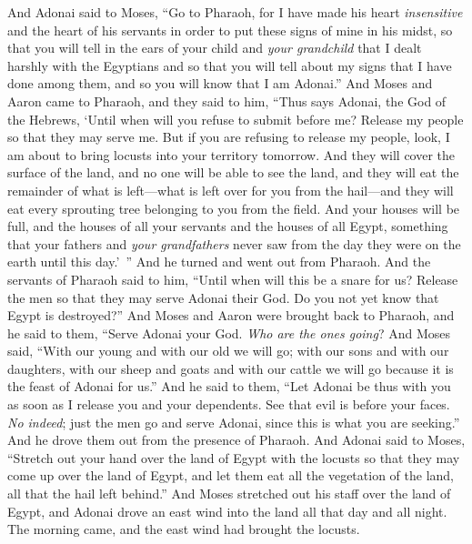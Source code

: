 \begin{biblechapter} %
 And Adonai said to Moses, “Go to Pharaoh, for I have made his heart \textit{insensitive} and the heart of his servants in order to put these signs of mine in his midst,
\verse so that you will tell in the ears of your child and \textit{your grandchild} that I dealt harshly with the Egyptians and so that you will tell about my signs that I have done among them, and so you will know that I am Adonai.”
\verse And Moses and Aaron came to Pharaoh, and they said to him, “Thus says Adonai, the God of the Hebrews, ‘Until when will you refuse to submit before me? Release my people so that they may serve me.
\verse But if you are refusing to release my people, look, I am about to bring locusts into your territory tomorrow.
\verse And they will cover the surface of the land, and no one will be able to see the land, and they will eat the remainder of what is left—what is left over for you from the hail—and they will eat every sprouting tree belonging to you from the field.
\verse And your houses will be full, and the houses of all your servants and the houses of all Egypt, something that your fathers and \textit{your grandfathers} never saw from the day they were on the earth until this day.’ ” And he turned and went out from Pharaoh.
\verse And the servants of Pharaoh said to him, “Until when will this be a snare for us? Release the men so that they may serve Adonai their God. Do you not yet know that Egypt is destroyed?”
\verse And Moses and Aaron were brought back to Pharaoh, and he said to them, “Serve Adonai your God. \textit{Who are the ones going}?
\verse And Moses said, “With our young and with our old we will go; with our sons and with our daughters, with our sheep and goats and with our cattle we will go because it is the feast of Adonai for us.”
\verse And he said to them, “Let Adonai be thus with you as soon as I release you and your dependents. See that evil is before your faces.
\verse \textit{No indeed}; just the men go and serve Adonai, since this is what you are seeking.” And he drove them out from the presence of Pharaoh.
\verse And Adonai said to Moses, “Stretch out your hand over the land of Egypt with the locusts so that they may come up over the land of Egypt, and let them eat all the vegetation of the land, all that the hail left behind.”
\verse And Moses stretched out his staff over the land of Egypt, and Adonai drove an east wind into the land all that day and all night. The morning came, and the east wind had brought the locusts.

\end{biblechapter}
